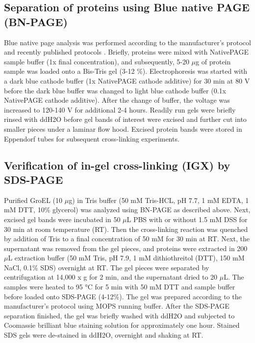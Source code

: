 \subsection*{Separation of proteins using Blue native PAGE (BN-PAGE)}
Blue native page analysis was performed according to the manufacturer's protocol and recently published protocols \cite{Wittig_2006}. Briefly, proteins were mixed with NativePAGE sample buffer (1x final concentration), and subsequently, 5-20 $\mu$g of protein sample was loaded onto a Bis-Tris gel (3-12 \%). Electrophoresis was started with a dark blue cathode buffer (1x NativePAGE cathode additive) for 30 min at 80 V before the dark blue buffer was changed to light blue cathode buffer (0.1x NativePAGE cathode additive). After the change of buffer, the voltage was increased to 120-140 V for additional 2-4 hours. Readily run gels were briefly rinsed with ddH2O before gel bands of interest were excised and further cut into smaller pieces under a laminar flow hood. Excised protein bands were stored in Eppendorf tubes for subsequent cross-linking experiments.

\subsection*{Verification of in-gel cross-linking (IGX) by SDS-PAGE}
Purified GroEL (10 $\mu$g) in Tris buffer (50 mM Tris-HCL, pH 7.7, 1 mM EDTA, 1 mM DTT, 10\% glycerol) was analyzed using BN-PAGE as described above. Next, excised gel bands were incubated in 50 $\mu$L PBS with or without 1.5 mM DSS for 30 min at room temperature (RT). Then the cross-linking reaction was quenched by addition of Tris to a final concentration of 50 mM for 30 min at RT. Next, the supernatant was removed from the gel pieces, and proteins were extracted in 200 $\mu$L extraction buffer (50 mM Tris, pH 7.9, 1 mM dithiothreitol (DTT), 150 mM NaCl, 0.1\% SDS) overnight at RT. The gel pieces were separated by centrifugation at 14,000 x g for 2 min, and the supernatant dried to 20 $\mu$L. The samples were heated to 95 °C for 5 min with 50 mM DTT and sample buffer before loaded onto SDS-PAGE (4-12\%). The gel was prepared according to the manufacturer's protocol using MOPS running buffer. After the SDS-PAGE separation finished, the gel was briefly washed with ddH2O and subjected to Coomassie brilliant blue staining solution for approximately one hour. Stained SDS gels were de-stained in ddH2O, overnight and shaking at RT.

